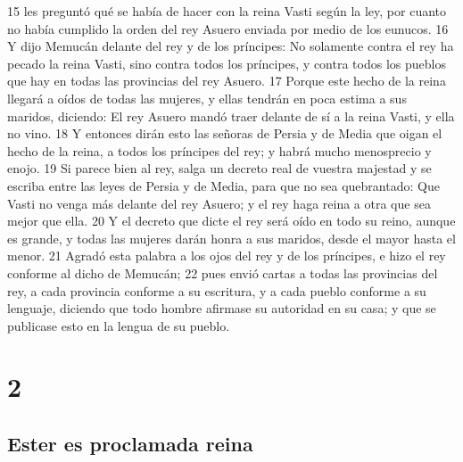 15 les preguntó qué se había de hacer con la reina Vasti según la ley, por cuanto no había cumplido la orden del rey Asuero enviada por medio de los eunucos.
16 Y dijo Memucán delante del rey y de los príncipes: No solamente contra el rey ha pecado la reina Vasti, sino contra todos los príncipes, y contra todos los pueblos que hay en todas las provincias del rey Asuero.
17 Porque este hecho de la reina llegará a oídos de todas las mujeres, y ellas tendrán en poca estima a sus maridos, diciendo: El rey Asuero mandó traer delante de sí a la reina Vasti, y ella no vino.
18 Y entonces dirán esto las señoras de Persia y de Media que oigan el hecho de la reina, a todos los príncipes del rey; y habrá mucho menosprecio y enojo.
19 Si parece bien al rey, salga un decreto real de vuestra majestad y se escriba entre las leyes de Persia y de Media, para que no sea quebrantado: Que Vasti no venga más delante del rey Asuero; y el rey haga reina a otra que sea mejor que ella.
20 Y el decreto que dicte el rey será oído en todo su reino, aunque es grande, y todas las mujeres darán honra a sus maridos, desde el mayor hasta el menor.
21 Agradó esta palabra a los ojos del rey y de los príncipes, e hizo el rey conforme al dicho de Memucán;
22 pues envió cartas a todas las provincias del rey, a cada provincia conforme a su escritura, y a cada pueblo conforme a su lenguaje, diciendo que todo hombre afirmase su autoridad en su casa; y que se publicase esto en la lengua de su pueblo.

\chapter{2}

\section*{Ester es proclamada reina}

